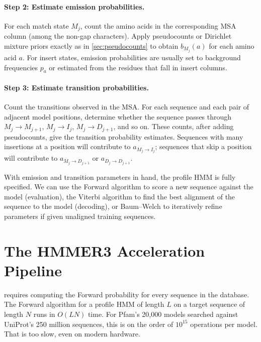 \paragraph{Step 2: Estimate emission probabilities.}
For each match state $M_j$, count the amino acids in the corresponding MSA column (among the non-gap characters).
Apply pseudocounts or Dirichlet mixture priors exactly as in \cref{sec:pseudocounts} to obtain $b_{M_j}(a)$ for each amino acid $a$.
For insert states, emission probabilities are usually set to background frequencies $p_a$ or estimated from the residues that fall in insert columns.

\paragraph{Step 3: Estimate transition probabilities.}
Count the transitions observed in the MSA.
For each sequence and each pair of adjacent model positions, determine whether the sequence passes through $M_j \to M_{j+1}$, $M_j \to I_j$, $M_j \to D_{j+1}$, and so on.
These counts, after adding pseudocounts, give the transition probability estimates.
Sequences with many insertions at a position will contribute to $a_{M_j \to I_j}$; sequences that skip a position will contribute to $a_{M_j \to D_{j+1}}$ or $a_{D_j \to D_{j+1}}$.

With emission and transition parameters in hand, the profile HMM is fully specified.
We can use the Forward algorithm to score a new sequence against the model (evaluation), the Viterbi algorithm to find the best alignment of the sequence to the model (decoding), or Baum--Welch to iteratively refine parameters if given unaligned training sequences.


\section{The HMMER3 Acceleration Pipeline}
\label{sec:hmmer3}

 requires computing the Forward probability for every sequence in the database.
The Forward algorithm for a profile HMM of length $L$ on a target sequence of length $N$ runs in $O(LN)$ time.
For Pfam's 20{,}000 models searched against UniProt's 250 million sequences, this is on the order of $10^{15}$ operations per model.
That is too slow, even on modern hardware.

